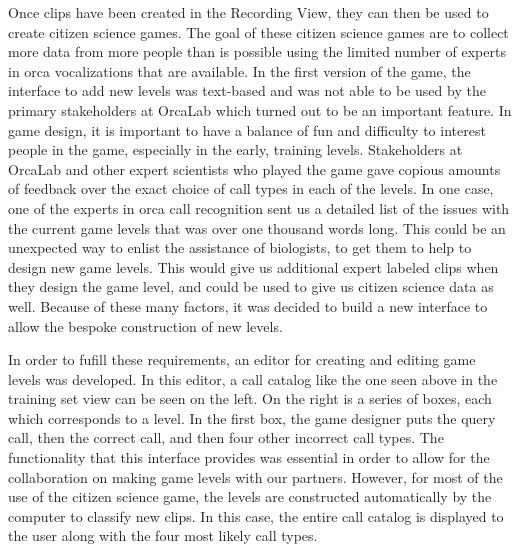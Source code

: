 Once clips have been created in the Recording View, they can then be
used to create citizen science games.  The goal of these citizen
science games are to collect more data from more people than is
possible using the limited number of experts in orca vocalizations
that are available.  In the first version of the game, the interface
to add new levels was text-based and was not able to be used by the
primary stakeholders at OrcaLab which turned out to be an important
feature.  In game design, it is important to have a balance of fun and
difficulty to interest people in the game, especially in the early,
training levels.  Stakeholders at OrcaLab and other expert scientists
who played the game gave copious amounts of feedback over the exact
choice of call types in each of the levels.  In one case, one of the
experts in orca call recognition sent us a detailed list of the issues
with the current game levels that was over one thousand words long.
This could be an unexpected way to enlist the assistance of
biologists, to get them to help to design new game levels.  This would
give us additional expert labeled clips when they design the game
level, and could be used to give us citizen science data as well.
Because of these many factors, it was decided to build a new interface
to allow the bespoke construction of new levels.

In order to fufill these requirements, an editor for creating and
editing game levels was developed.  In this editor, a call catalog
like the one seen above in the training set view can be seen on the
left.  On the right is a series of boxes, each which corresponds to a
level.  In the first box, the game designer puts the query call, then
the correct call, and then four other incorrect call types.  The
functionality that this interface provides was essential in order to
allow for the collaboration on making game levels with our partners.
However, for most of the use of the citizen science game, the levels
are constructed automatically by the computer to classify new clips.
In this case, the entire call catalog is displayed to the user along
with the four most likely call types.

